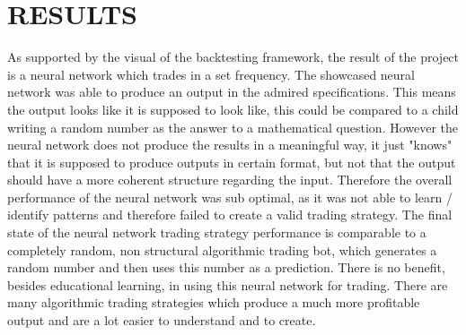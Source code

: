 \documentclass{article}
\begin{document}
\section{RESULTS}
As supported by the visual of the backtesting framework, the result of the project is a neural network which trades in a set frequency. The showcased neural network was able to produce an output in the admired specifications. This means the output looks like it is supposed to look like, this could be compared to a child writing a random number as the answer to a mathematical question. However the neural network does not produce the results in a meaningful way, it just "knows" that it is supposed to produce outputs in certain format, but not that the output should have a more coherent structure regarding the input. Therefore the overall performance of the neural network was sub optimal, as it was not able to learn / identify patterns and therefore failed to create a valid trading strategy. The final state of the neural network trading strategy performance is comparable to a completely random, non structural algorithmic trading bot, which generates a random number and then uses this number as a prediction. There is no benefit, besides educational learning, in using this neural network for trading. There are many algorithmic trading strategies \cite{betterbot} which produce a much more profitable output and are a lot easier to understand and to create.
\end{document}
